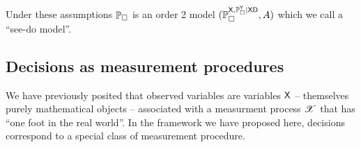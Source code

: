Under these assumptions $\mathbb{P}_\square$ is an order 2 model $(\mathbb{P}_\square^{\mathsf{X},\mathbb{P}_\square^{\mathsf{Y}}|\mathsf{XD}},A)$ which we call a ``see-do model''.




\subsection{Decisions as measurement procedures}

We have previously posited that observed variables are variables $\mathsf{X}$ -- themselves purely mathematical objects -- associated with a measurment process $\mathscr{X}$ that has ``one foot in the real world''. In the framework we have proposed here, decisions correspond to a special class of measurement procedure.


